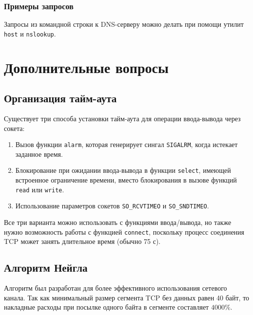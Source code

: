 \subsubsection{Примеры запросов}

Запросы из командной строки к DNS-серверу можно делать при помощи утилит \lstinline{host} и \lstinline{nslookup}.

\section{Дополнительные вопросы}
\label{sec:network-addition}

\subsection{Организация тайм-аута}
Существует три способа установки тайм-аута для операции ввода-вывода через сокета:
\begin{enumerate}
  \item Вызов функции \lstinline{alarm}, которая генерирует сингал \lstinline{SIGALRM}, когда истекает заданное время.
  \item Блокирование при ожидании ввода-вывода в функции \lstinline{select}, имеющей встроенное ограничение времени, вместо блокирования в вызове функций \lstinline{read} или \lstinline{write}.
  \item Использование параметров сокетов \lstinline{SO_RCVTIMEO} и \lstinline{SO_SNDTIMEO}.
\end{enumerate}

Все три варианта можно использовать с функциями ввода/вывода, но также нужно возможность работы с функцией \lstinline{connect}, поскольку процесс соединения TCP может занять длительное время (обычно 75 с).

\subsection{Алгоритм Нейгла}
\label{sec:nagle-algorithm}
Алгоритм был разработан для более эффективного использования сетевого канала. Так как минимальный размер сегмента TCP без данных равен 40 байт, то накладные расходы при посылке одного байта в сегменте составляет $4000\%$.

